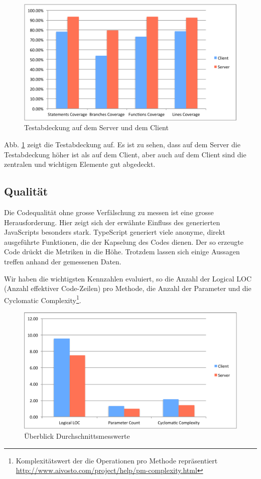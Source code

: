 	\begin{figure}[H]
		\includegraphics[width=\textwidth]{projectPlan/media/img/coverage.pdf}
		\centering
		\caption{Testabdeckung auf dem Server und dem Client}
		\label{fig:coverage}
	\end{figure}
	
	Abb. \ref{fig:coverage} zeigt die Testabdeckung auf.
	Es ist zu sehen, dass auf dem Server die Testabdeckung höher ist als auf dem Client,
	aber auch auf dem Client sind die zentralen und wichtigen Elemente gut abgedeckt.
	
	
	\subsection{Qualität}
	Die Codequalität ohne grosse Verfälschung zu messen ist eine grosse Herausforderung.
	Hier zeigt sich der erwähnte Einfluss des generierten JavaScripts besonders stark. TypeScript generiert viele anonyme, direkt ausgeführte Funktionen, die der Kapselung des Codes dienen. 
	Der so erzeugte Code drückt die Metriken in die Höhe. Trotzdem lassen sich einige Aussagen treffen anhand der gemessenen Daten.
	
	Wir haben die wichtigsten Kennzahlen evaluiert,
	so die Anzahl der Logical LOC (Anzahl effektiver Code-Zeilen) pro Methode, die Anzahl der Parameter und die Cyclomatic Complexity\footnote{Komplexitätswert der die Operationen pro Methode repräsentiert \url{http://www.aivosto.com/project/help/pm-complexity.html}}.
	
	\begin{figure}[H]
		\includegraphics[width=\textwidth]{projectPlan/media/img/methodComplexityOverview.pdf}
		\centering
		\caption{Überblick Durchschnittsmesswerte}
		\label{fig:methodComplexityOverview}
	\end{figure}
	

